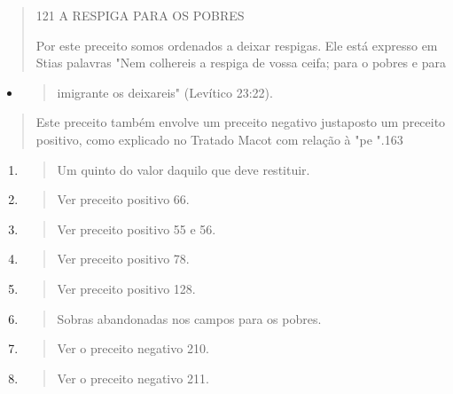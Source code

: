 \begin{quote}
121 A RESPIGA PARA OS POBRES

Por este preceito somos ordenados a deixar respigas. Ele está expresso
em Stias palavras "Nem colhereis a respiga de vossa ceifa; para o pobres
e para
\end{quote}

\begin{itemize}
\item
  \begin{quote}
  imigrante os deixareis" (Levítico 23:22).
  \end{quote}
\end{itemize}

\begin{quote}
Este preceito também envolve um preceito negativo justaposto um preceito
positivo, como explicado no Tratado Macot com relação à "pe ".163
\end{quote}

\begin{enumerate}
\def\labelenumi{\arabic{enumi}.}
\setcounter{enumi}{155}
\item
  \begin{quote}
  Um quinto do valor daquilo que deve restituir.
  \end{quote}
\item
  \begin{quote}
  Ver preceito positivo 66.
  \end{quote}
\item
  \begin{quote}
  Ver preceito positivo 55 e 56.
  \end{quote}
\item
  \begin{quote}
  Ver preceito positivo 78.
  \end{quote}
\item
  \begin{quote}
  Ver preceito positivo 128.
  \end{quote}
\item
  \begin{quote}
  Sobras abandonadas nos campos para os pobres.
  \end{quote}
\item
  \begin{quote}
  Ver o preceito negativo 210.
  \end{quote}
\item
  \begin{quote}
  Ver o preceito negativo 211.
  \end{quote}
\end{enumerate}

